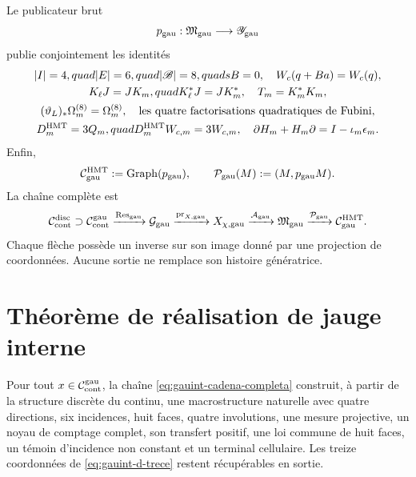 Le publicateur brut
\begin{equation}\label{eq:gauint-publicador-crudo}
 p_{\rm gau}:\mathfrak M_{\rm gau}\longrightarrow
 \mathscr Y_{\rm gau}
\end{equation}
publie conjointement les identités
\[
 \begin{gathered}
 |I|=4,quad |E|=6,quad |\mathscr B|=8,quad sB=0,
 \quad W_c(q+Ba)=W_c(q),\\
 K_\ell J=JK_m,quad K_\ell^*J=JK_m^*,
 \quad T_m=K_m^*K_m,\\
 (\vartheta_L)_*\Omega_m^{(8)}=\Omega_m^{(8)},
 \quad \text{les quatre factorisations quadratiques de Fubini},\\
 D_m^{\rm HMT}=3Q_m,quad D_m^{\rm HMT}W_{c,m}=3W_{c,m},
 \quad \partial H_m+H_m\partial=I-\iota_m\epsilon_m.
 \end{gathered}
\]
Enfin,
\begin{equation}\label{eq:gauint-graph-p}
 \mathcal C_{\rm gau}^{\rm HMT}:=\operatorname{Graph}(p_{\rm gau}),
 \qquad
 \mathcal P_{\rm gau}(M):=(M,p_{\rm gau}M).
\end{equation}
La chaîne complète est
\begin{equation}\label{eq:gauint-cadena-completa}
 \mathcal C_{\rm cont}^{\rm disc}\supset
 \mathcal C_{\rm cont}^{\rm gau}
 \xrightarrow{\operatorname{Res}_{\rm gau}}\mathcal G_{\rm gau}
 \xrightarrow{\operatorname{pr}_{X,{\rm gau}}}X_{\chi,{\rm gau}}
 \xrightarrow{\mathcal A_{\rm gau}}\mathfrak M_{\rm gau}
 \xrightarrow{\mathcal P_{\rm gau}}\mathcal C_{\rm gau}^{\rm HMT}.
\end{equation}
Chaque flèche possède un inverse sur son image donné par une projection de
coordonnées. Aucune sortie ne remplace son histoire génératrice.

\section{Théorème de réalisation de jauge interne}

\begin{theorem}
\label{thm:gauint-realizacion}
Pour tout \(x\in\mathcal C_{\rm cont}^{\rm gau}\), la chaîne
\eqref{eq:gauint-cadena-completa} construit, à partir de la structure
discrète du continu, une macrostructure naturelle avec quatre directions,
six incidences, huit faces, quatre involutions, une mesure projective, un
noyau de comptage complet, son transfert positif, une loi commune de huit
faces, un témoin d'incidence non constant et un terminal cellulaire. Les
treize coordonnées de \eqref{eq:gauint-d-trece} restent récupérables en
sortie.
\end{theorem}

